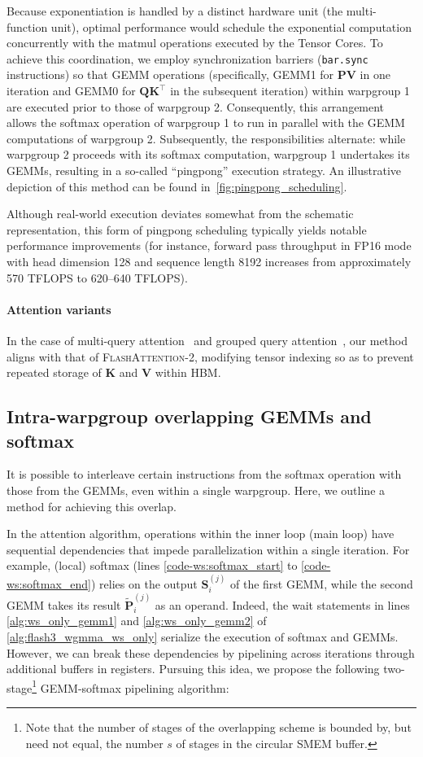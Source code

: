 \begin{enumerate}
Because exponentiation is handled by a distinct hardware unit (the multi-function unit), optimal performance would schedule the exponential computation concurrently with the matmul operations executed by the Tensor Cores. To achieve this coordination, we employ synchronization barriers (\texttt{bar.sync} instructions) so that GEMM operations (specifically, GEMM1 for $\mathbf{P} \mathbf{V}$ in one iteration and GEMM0 for $\mathbf{Q} \mathbf{K}^\top$ in the subsequent iteration) within warpgroup 1 are executed prior to those of warpgroup 2. Consequently, this arrangement allows the softmax operation of warpgroup 1 to run in parallel with the GEMM computations of warpgroup 2. Subsequently, the responsibilities alternate: while warpgroup 2 proceeds with its softmax computation, warpgroup 1 undertakes its GEMMs, resulting in a so-called ``pingpong'' execution strategy. An illustrative depiction of this method can be found in~\cref{fig:pingpong_scheduling}.

Although real-world execution deviates somewhat from the schematic representation, this form of pingpong scheduling typically yields notable performance improvements (for instance, forward pass throughput in FP16 mode with head dimension 128 and sequence length 8192 increases from approximately 570 TFLOPS to 620--640 TFLOPS).

\paragraph{Attention variants} In the case of multi-query attention~\citep{shazeer2019fast} and grouped query attention~\citep{ainslie2023gqa}, our method aligns with that of \textsc{FlashAttention-2}, modifying tensor indexing so as to prevent repeated storage of $\mathbf{K}$ and $\mathbf{V}$ within HBM.

\subsection{Intra-warpgroup overlapping GEMMs and softmax}

It is possible to interleave certain instructions from the softmax operation with those from the GEMMs, even within a single warpgroup. Here, we outline a method for achieving this overlap.

In the attention algorithm, operations within the inner loop (main loop) have sequential dependencies that impede parallelization within a single iteration. For example, (local) softmax (lines \ref{code-ws:softmax_start} to \ref{code-ws:softmax_end}) relies on the output $\mathbf{S}_i^{(j)}$ of the first GEMM, while the second GEMM takes its result $\widetilde{\mathbf{P}}_i^{(j)}$ as an operand. Indeed, the wait statements in lines \ref{alg:ws_only_gemm1} and \ref{alg:ws_only_gemm2} of \cref{alg:flash3_wgmma_ws_only} serialize the execution of softmax and GEMMs. However, we can break these dependencies by pipelining across iterations through additional buffers in registers. Pursuing this idea, we propose the following two-stage\footnote{Note that the number of stages of the overlapping scheme is bounded by, but need not equal, the number $s$ of stages in the circular SMEM buffer.} GEMM-softmax pipelining algorithm:


\end{enumerate}
